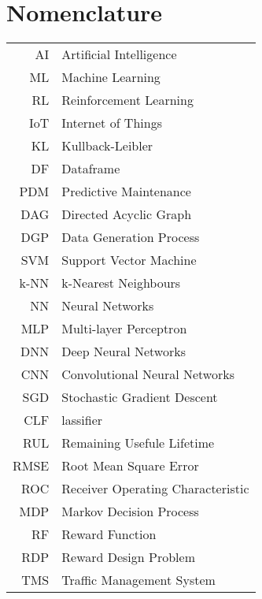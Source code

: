 \chapter*{Nomenclature}
    \thispagestyle{empty}
    \begin{center}
        \begin{tabular}{r l}
         AI & Artificial Intelligence \\
         ML & Machine Learning \\ 
         RL & Reinforcement Learning \\
         IoT & Internet of Things \\
         KL & Kullback-Leibler \\
         DF & Dataframe \\
         PDM & Predictive Maintenance \\
         DAG & Directed Acyclic Graph \\
         DGP & Data Generation Process \\
         SVM & Support Vector Machine \\
         k-NN & k-Nearest Neighbours \\
         NN & Neural Networks \\
         MLP & Multi-layer Perceptron \\
         DNN & Deep Neural Networks \\
         CNN & Convolutional Neural Networks \\
         SGD & Stochastic Gradient Descent \\
         CLF & lassifier \\
         RUL & Remaining Usefule Lifetime \\
         RMSE & Root Mean Square Error \\
         ROC & Receiver Operating Characteristic \\
         MDP & Markov Decision Process \\
         RF & Reward Function \\
         RDP & Reward Design Problem \\
         TMS & Traffic Management System \\
        \end{tabular}
    \end{center}